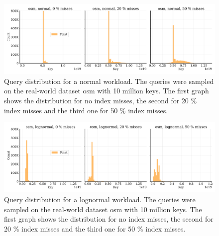 \begin{figure}[ht]
    \centering
    \includegraphics[width=\textwidth]{figures/app_exp4_normal_query_dist.pdf}
    \caption[osm query distribution after normal sampling with index misses]{Query distribution for a normal workload. The queries were sampled on the real-world dataset osm with 10 million keys. The first graph shows the distribution for no index misses, the second for 20 \% index misses and the third one for 50 \% index misses.}
    \label{fig:app_exp4_normal_query_dist}
\end{figure}

\begin{figure}[ht]
    \centering
    \includegraphics[width=\textwidth]{figures/app_exp4_lognormal_query_dist.pdf}
    \caption[osm query distribution after lognormal sampling with index misses]{Query distribution for a lognormal workload. The queries were sampled on the real-world dataset osm with 10 million keys. The first graph shows the distribution for no index misses, the second for 20 \% index misses and the third one for 50 \% index misses.}
    \label{fig:app_exp4_lognormal_query_dist}
\end{figure}